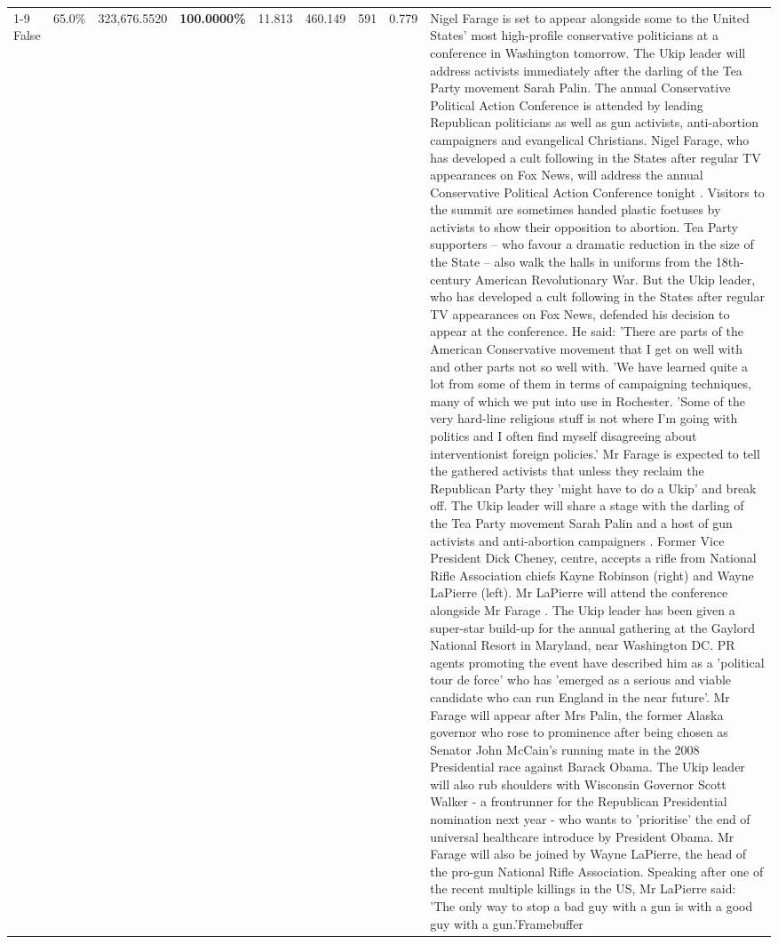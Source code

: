 \begin{table}[H]
\begin{tabular}{lllrlllll}
\cline{1-9}
False & 65.0\% & 323,676.5520 & \bfseries \color{red} 100.0000\% & 11.813 & 460.149 & 591 & 0.779 & Nigel Farage is set to appear alongside some to the United States' most high-profile conservative politicians at a conference in Washington tomorrow. The Ukip leader will address activists immediately after the darling of the Tea Party movement Sarah Palin. The annual Conservative Political Action Conference is attended by leading Republican politicians as well as gun activists, anti-abortion campaigners and evangelical Christians. Nigel Farage, who has developed a cult following in the States after regular TV appearances on Fox News, will address the annual Conservative Political Action Conference tonight . Visitors to the summit are sometimes handed plastic foetuses by activists to show their opposition to abortion. Tea Party supporters – who favour a dramatic reduction in the size of the State – also walk the halls in uniforms from the 18th-century American Revolutionary War. But the Ukip leader, who has developed a cult following in the States after regular TV appearances on Fox News, defended his decision to appear at the conference. He said: 'There are parts of the American Conservative movement that I get on well with and other parts not so well with. 'We have learned quite a lot from some of them in terms of campaigning techniques, many of which we put into use in Rochester. 'Some of the very hard-line religious stuff is not where I'm going with politics and I often find myself disagreeing about interventionist foreign policies.' Mr Farage is expected to tell the gathered activists that unless they reclaim the Republican Party they 'might have to do a Ukip' and break off. The Ukip leader will share a stage with the darling of the Tea Party movement Sarah Palin and a host of gun activists and anti-abortion campaigners . Former Vice President Dick Cheney, centre, accepts a rifle from National Rifle Association chiefs Kayne Robinson (right) and Wayne LaPierre (left). Mr LaPierre will attend the conference alongside Mr Farage . The Ukip leader has been given a super-star build-up for the annual gathering at the Gaylord National Resort in Maryland, near Washington DC. PR agents promoting the event have described him as a 'political tour de force' who has 'emerged as a serious and viable candidate who can run England in the near future'. Mr Farage will appear after Mrs Palin, the former Alaska governor who rose to prominence after being chosen as Senator John McCain's running mate in the 2008 Presidential race against Barack Obama. The Ukip leader will also rub shoulders with Wisconsin Governor Scott Walker - a frontrunner for the Republican Presidential nomination next year - who wants to 'prioritise' the end of universal healthcare introduce by President Obama. Mr Farage will also be joined by Wayne LaPierre, the head of the pro-gun National Rifle Association. Speaking after one of the recent multiple killings in the US, Mr LaPierre said: 'The only way to stop a bad guy with a gun is with a good guy with a gun.'Framebuffer \\

\end{tabular}
\end{table}

